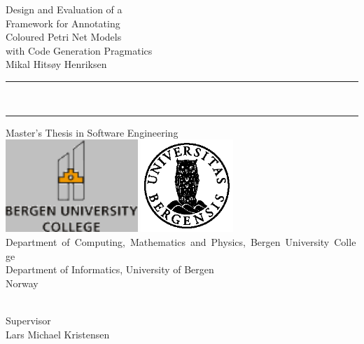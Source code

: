
\vspace*{\fill}
\begin{flushright}
  {\Huge\sf Design and Evaluation of a}\\[2ex]
  {\Huge\sf Framework for Annotating}\\[2ex]
  {\Huge\sf Coloured Petri Net Models}\\[2ex]
  {\Huge\sf with Code Generation Pragmatics}\\[4ex]
  {\huge\sf Mikal Hitsøy Henriksen} 
\end{flushright}
\noindent\rule{\linewidth}{1mm}\\[-.5ex]
\noindent\rule{\linewidth}{2.5mm}
\vfill
\begin{center}
  {\huge\sf Master's Thesis in Software Engineering}\\[\fill]
  \includegraphics[height=35mm]{hib_logo_english_web.png}\hspace{15mm}
  \includegraphics[height=35mm,trim=5mm 5mm 5mm 5mm]
  {UiBmerke_grayscaleV8.eps}\\[\fill]
  {\sf \mbox{Department of Computing, Mathematics and Physics, Bergen University College} \\
  Department of Informatics, University of Bergen\\
  Norway}
\end{center}
\begin{center}
  {\sf \makeatletter\@date\makeatother\\Supervisor\\Lars Michael Kristensen}
\end{center}
\vspace*{\fill}